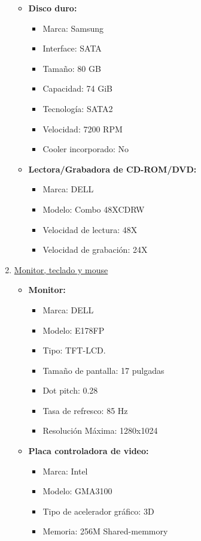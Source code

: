 \begin{enumerate}
\begin{itemize}
    \item \textbf{Disco duro:}
    \begin{itemize}
      \item Marca: Samsung
      \item Interface: SATA
      \item Tamaño: 80 GB
      \item Capacidad: 74 GiB
      \item Tecnología: SATA2
      \item Velocidad: 7200 RPM
      \item Cooler incorporado: No
    \end{itemize}
    
    \item \textbf{Lectora/Grabadora de CD-ROM/DVD:}
    \begin{itemize}
      \item Marca: DELL
      \item Modelo: Combo 48XCDRW
      \item Velocidad de lectura: 48X
      \item Velocidad de grabación: 24X
    \end{itemize}
  \end{itemize}
  
  \item \underline{Monitor, teclado y mouse}
  \begin{itemize}
    \item \textbf{Monitor:}
    \begin{itemize}
      \item Marca: DELL
      \item Modelo: E178FP
      \item Tipo: TFT-LCD.
      \item Tamaño de pantalla: 17 pulgadas
      \item Dot pitch: 0.28
      \item Tasa de refresco: 85 Hz
      \item Resolución Máxima: 1280x1024
    \end{itemize}
    
    \item \textbf{Placa controladora de video:}
    \begin{itemize}
      \item Marca: Intel
      \item Modelo: GMA3100
      \item Tipo de acelerador gráfico: 3D
      \item Memoria: 256M Shared-memmory
    \end{itemize}
    

\end{itemize}
\end{enumerate}
